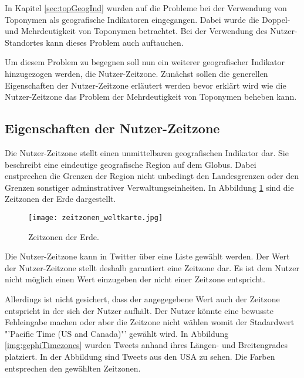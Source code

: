		In Kapitel \ref{sec:topGeogInd} wurden auf die Probleme bei der Verwendung von Toponymen als geografische Indikatoren eingegangen.
		Dabei wurde die Doppel- und Mehrdeutigkeit von Toponymen betrachtet.
		Bei der Verwendung des Nutzer-Standortes kann dieses Problem auch auftauchen. 

		Um diesem Problem zu begegnen soll nun ein weiterer geografischer Indikator hinzugezogen werden, die Nutzer-Zeitzone.
		Zunächst sollen die generellen Eigenschaften der Nutzer-Zeitzone erläutert werden bevor erklärt wird wie die Nutzer-Zeitzone das Problem der Mehrdeutigkeit von Toponymen beheben kann.

		\subsection{Eigenschaften der Nutzer-Zeitzone}

			Die Nutzer-Zeitzone stellt einen unmittelbaren geografischen Indikator dar. 
			Sie beschreibt eine eindeutige geografische Region auf dem Globus.
			Dabei enstprechen die Grenzen der Region nicht unbedingt den Landesgrenzen oder den Grenzen sonstiger adminstrativer Verwaltungseinheiten. 
			In Abbildung \ref{img:timezones} sind die Zeitzonen der Erde dargestellt.

			\begin{figure}[h!]
				\begin{center}
					\texttt{[image: zeitzonen\_weltkarte.jpg]}
					\caption{Zeitzonen der Erde. }
					\label{img:timezones}
				\end{center}
			\end{figure}	

			Die Nutzer-Zeitzone kann in Twitter über eine Liste gewählt werden.
			Der Wert der Nutzer-Zeitzone stellt deshalb garantiert eine Zeitzone dar.
			Es ist dem Nutzer nicht möglich einen Wert einzugeben der nicht einer Zeitzone entspricht.

			Allerdings ist nicht gesichert, dass der angegegebene Wert auch der Zeitzone entspricht in der sich der Nutzer aufhält.
			Der Nutzer könnte eine bewusste Fehleingabe machen oder aber die Zeitzone nicht wählen womit der Stadardwert "'Pacific Time (US and Canada)"' gewählt wird.
			In Abbildung \ref{img:gephiTimezones} wurden Tweets anhand ihres Längen- und Breitengrades platziert.
			In der Abbildung sind Tweets aus den USA zu sehen. 
			Die Farben entsprechen den gewählten Zeitzonen.

